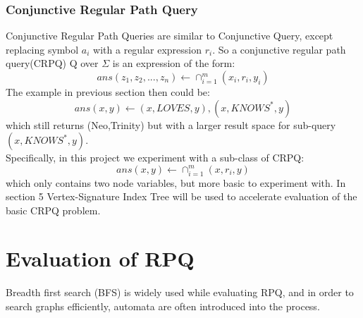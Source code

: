 \subsubsection{Conjunctive Regular Path Query}
Conjunctive Regular Path Queries are similar to Conjunctive Query, except replacing symbol $a_i$ with a regular expression $r_i$. So a conjunctive regular path query(CRPQ) Q over $\Sigma$ is an expression of the form:
$$ans(z_1,z_2,...,z_n) \leftarrow \cap_{i=1}^{m} (x_i,r_i,y_i)$$
The example in previous section then could be:
$$ans(x,y)\leftarrow (x,LOVES,y),(x,KNOWS^*,y)$$
which still returns (Neo,Trinity) but with a larger result space for sub-query $(x,KNOWS^*,y)$.\\
Specifically, in this project we experiment with a sub-class of CRPQ:
$$ans(x,y) \leftarrow \cap_{i=1}^{m} (x,r_i,y)$$
which only contains two node variables, but more basic to experiment with. In section 5 Vertex-Signature Index Tree will be used to accelerate evaluation of the basic CRPQ problem.
\section{Evaluation of RPQ}
Breadth first search (BFS) is widely used while evaluating RPQ\cite{mendelzon1995finding}\cite{koschmieder2012regular}\cite{tung2013efficient}, and in order to search graphs efficiently, automata are often introduced into the process.
